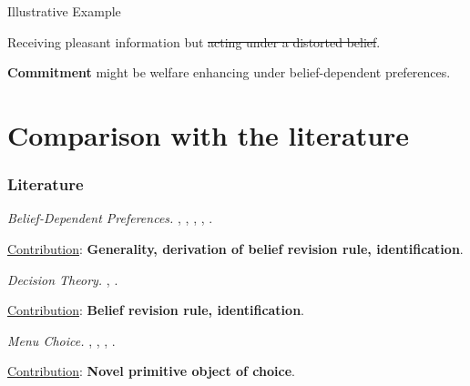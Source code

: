 \documentclass[usenames,dvipsnames,aspectratio=169,11pt]{beamer}
\begin{document}
\begin{frame}[noframenumbering]{Illustrative Example}
\begin{table}[H]
\begin{minipage}{0.45\textwidth}
\begin{tikzpicture}[x=0.75pt,y=0.75pt,yscale=-1,xscale=1]
			\end{tikzpicture}
		\end{minipage}
	\end{table}

	\vfill

	Receiving pleasant information but \sout{acting under a distorted belief}.

	\vfill

	\textbf{Commitment} might be welfare enhancing under belief-dependent preferences.

\end{frame}

\section{Comparison with the literature}

\begin{frame}\frametitle{Literature}

	\begin{wideitemize}
		\item \textit{Belief-Dependent Preferences.} \cite{brunnermeierOptimalExpectations2005}, \cite{eliazCanAnticipatoryFeelings2006}, \cite{benabou2016mindful}, \cite{golmanInformationAvoidance2017}, \cite{battigalliBeliefdependentMotivationsPsychological2022}.

		\vspace{0.3cm}
		\underline{Contribution}: \textbf{Generality, derivation of belief revision rule, identification}.

		\item \textit{Decision Theory.} \cite{liangInformationdependentExpectedUtility2017}, \cite{dillenbergerAdditivebeliefbasedPreferences2020} \cite{rommeswinkelPreferenceKnowledge2023}.

		\vspace{0.3cm}
		\underline{Contribution}: \textbf{Belief revision rule, identification}.
		\item \textit{Menu Choice.} \cite{gulTemptationSelfControl2001}, \cite{ozdenorenCompletingStateSpace2002}, \cite{epsteinAxiomaticModelNonBayesian2006}, \cite{epsteinColdFeet2007}.

		\vspace{0.3cm}
		\underline{Contribution}: \textbf{Novel primitive object of choice}.
	\end{wideitemize}

\end{frame}
\end{document}

